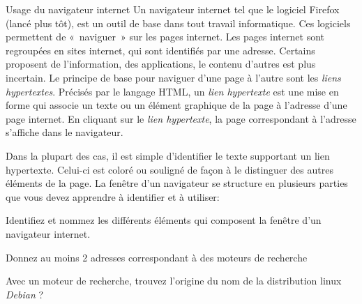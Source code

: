 \begin{exercice}
  \begin{exercicelet}{Usage du navigateur internet}
    Un navigateur internet tel que le logiciel Firefox (lancé plus tôt),
    est un outil de base dans tout travail informatique. Ces logiciels
    permettent de «~naviguer~» sur les pages internet. Les pages
    internet sont regroupées en sites internet, qui sont identifiés par
    une adresse. Certains proposent de l'information, des applications,
    le contenu d'autres est plus incertain.  Le principe de base pour
    naviguer d'une page à l'autre sont les \emph{liens
      hypertextes}. Précisés par le langage HTML, un \emph{lien
      hypertexte} est une mise en forme qui associe un texte ou un
    élément graphique de la page à l'adresse d'une page internet. En
    cliquant sur le \emph{lien hypertexte}, la page correspondant à
    l'adresse s'affiche dans le navigateur.

    Dans la plupart des cas, il est simple d'identifier le texte
    supportant un lien hypertexte. Celui-ci est coloré ou souligné de
    façon à le distinguer des autres éléments de la page.  La fenêtre
    d'un navigateur se structure en plusieurs parties que vous devez
    apprendre à identifier et à utiliser:

    \begin{questions}
    \item Identifiez et nommez les différents éléments qui composent la
      fenêtre d'un navigateur internet.
    \item Donnez au moins 2 adresses correspondant à des moteurs de
      recherche
    \item Avec un moteur de recherche, trouvez l'origine du nom de la distribution linux \emph{Debian} ?
    \end{questions}
  \end{exercicelet}
\end{exercice}
